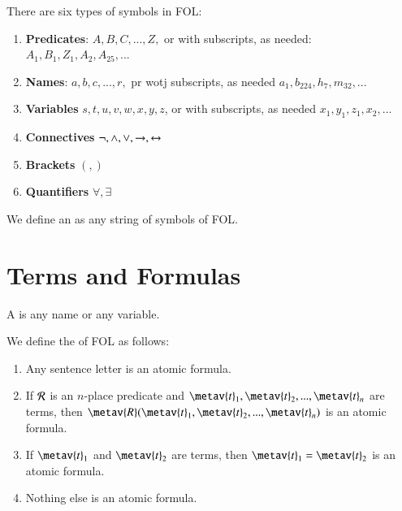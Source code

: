 \documentclass[12pt, a4paper, oneside, openright, titlepage]{book}
\begin{document}
\begin{defn}
    There are six types of symbols in FOL: \begin{enumerate}
        \item \textbf{Predicates}: $A,B,C,...,Z,$ or with subscripts, as needed: $A_1,B_1,Z_1,A_2,A_{25},...$
        \item \textbf{Names}: $a,b,c,...,r,$ pr wotj subscripts, as needed $a_1,b_{224},h_7,m_{32},...$
        \item \textbf{Variables} $s,t,u,v,w,x,y,z$, or with subscripts, as needed $x_1,y_1,z_1,x_2,...$
        \item \textbf{Connectives} $\neg, \wedge, \vee, \rightarrow, \leftrightarrow$
        \item \textbf{Brackets} $(,)$
        \item \textbf{Quantifiers} $\forall,\exists$
    \end{enumerate}
    We define an  as any string of symbols of FOL.
\end{defn}


\section{\textsection Terms and Formulas}

\begin{defn}
    A  is any name or any variable.
\end{defn}


\begin{defn}
    We define the  of FOL as follows: \begin{enumerate}
        \item Any sentence letter is an atomic formula.
        \item If $\mathcal{R}$ is an $n$-place predicate and $\metav{t}_1,\metav{t}_2,...,\metav{t}_n$ are terms, then $\metav{R}(\metav{t}_1,\metav{t}_2,...,\metav{t}_n)$ is an atomic formula.
        \item If $\metav{t}_1$ and $\metav{t}_2$ are terms, then $\metav{t}_1 = \metav{t}_2$ is an atomic formula.
        \item Nothing else is an atomic formula.
    \end{enumerate}
\end{defn}
\end{document}
